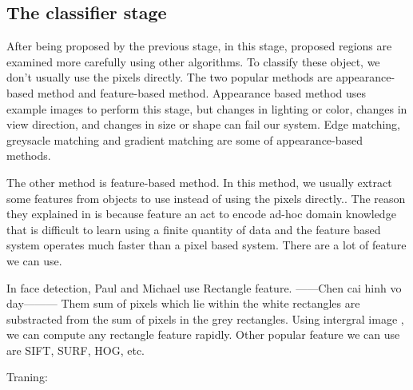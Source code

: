 \subsection{The classifier stage}

After being proposed by the previous stage, in this stage, proposed regions are examined more carefully using other algorithms.
To classify these object, we don't usually use the pixels directly. The two popular methods are appearance-based method and feature-based method. 
Appearance based method uses example images to perform this stage, but changes in lighting or color, changes in view direction, and changes in size or shape can fail our system. Edge matching, greysacle matching and gradient matching are some of appearance-based methods.

The other method is feature-based method. In this method, we usually extract some features from objects to use instead of using the pixels directly.\cite{realtimeface}. The reason they explained in \cite{realtimeface} is because feature an act to encode ad-hoc domain knowledge that is difficult to learn using a finite quantity of data and the feature based system operates much faster than a pixel based system. There are a lot of feature we can use. 

In face detection\cite{realtimeface}, Paul and Michael use Rectangle feature. 
------Chen cai hinh vo day---------
Them sum of pixels which lie within the white rectangles are substracted from the sum of pixels in the grey rectangles. Using intergral image \cite{realtimeface}, we can compute any rectangle feature rapidly. Other popular feature we can use are SIFT, SURF, HOG, etc.

Traning: